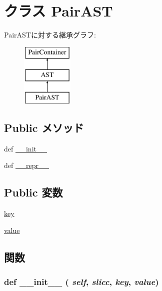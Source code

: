 \hypertarget{classslicc_1_1ast_1_1PairAST_1_1PairAST}{
\section{クラス PairAST}
\label{classslicc_1_1ast_1_1PairAST_1_1PairAST}
}
PairASTに対する継承グラフ:\begin{figure}[H]
\begin{center}
\leavevmode
\includegraphics[height=3cm]{classslicc_1_1ast_1_1PairAST_1_1PairAST}
\end{center}
\end{figure}
\subsection*{Public メソッド}
\begin{DoxyCompactItemize}
\item 
def \hyperlink{classslicc_1_1ast_1_1PairAST_1_1PairAST_ac775ee34451fdfa742b318538164070e}{\_\-\_\-init\_\-\_\-}
\item 
def \hyperlink{classslicc_1_1ast_1_1PairAST_1_1PairAST_ad8b9328939df072e4740cd9a63189744}{\_\-\_\-repr\_\-\_\-}
\end{DoxyCompactItemize}
\subsection*{Public 変数}
\begin{DoxyCompactItemize}
\item 
\hyperlink{classslicc_1_1ast_1_1PairAST_1_1PairAST_ab0d96f9d852c2058c2546a1338e87544}{key}
\item 
\hyperlink{classslicc_1_1ast_1_1PairAST_1_1PairAST_afcc7a4b78ecd8fa7e713f8cfa0f51017}{value}
\end{DoxyCompactItemize}


\subsection{関数}
\hypertarget{classslicc_1_1ast_1_1PairAST_1_1PairAST_ac775ee34451fdfa742b318538164070e}{
\subsubsection[{\_\-\_\-init\_\-\_\-}]{\setlength{\rightskip}{0pt plus 5cm}def \_\-\_\-init\_\-\_\- ( {\em self}, \/   {\em slicc}, \/   {\em key}, \/   {\em value})}}
\label{classslicc_1_1ast_1_1PairAST_1_1PairAST_ac775ee34451fdfa742b318538164070e}



